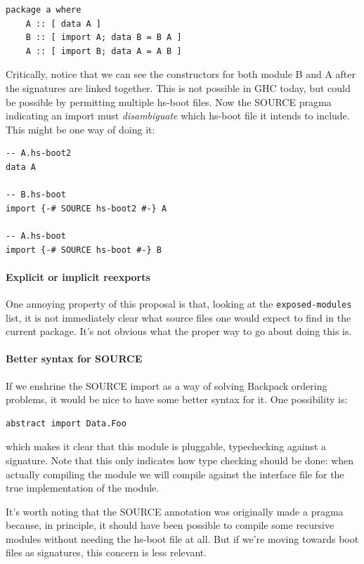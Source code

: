 \documentclass{article}
\begin{document}
\begin{verbatim}
package a where
    A :: [ data A ]
    B :: [ import A; data B = B A ]
    A :: [ import B; data A = A B ]
\end{verbatim}

Critically, notice that we can see the constructors for both module B and A
after the signatures are linked together.  This is not possible in GHC
today, but could be possible by permitting multiple hs-boot files.  Now
the SOURCE pragma indicating an import must \emph{disambiguate} which
hs-boot file it intends to include.  This might be one way of doing it:

\begin{verbatim}
-- A.hs-boot2
data A

-- B.hs-boot
import {-# SOURCE hs-boot2 #-} A

-- A.hs-boot
import {-# SOURCE hs-boot #-} B
\end{verbatim}

\paragraph{Explicit or implicit reexports}  One annoying property of
this proposal is that, looking at the \verb|exposed-modules| list, it is
not immediately clear what source files one would expect to find in the
current package.  It's not obvious what the proper way to go about doing
this is.

\paragraph{Better syntax for SOURCE}  If we enshrine the SOURCE import
as a way of solving Backpack ordering problems, it would be nice to have
some better syntax for it. One possibility is:

\begin{verbatim}
abstract import Data.Foo
\end{verbatim}

which makes it clear that this module is pluggable, typechecking against
a signature.  Note that this only indicates how type checking should be
done: when actually compiling the module we will compile against the
interface file for the true implementation of the module.

It's worth noting that the SOURCE annotation was originally made a
pragma because, in principle, it should have been possible to compile
some recursive modules without needing the hs-boot file at all. But if
we're moving towards boot files as signatures, this concern is less
relevant.
\end{document}
